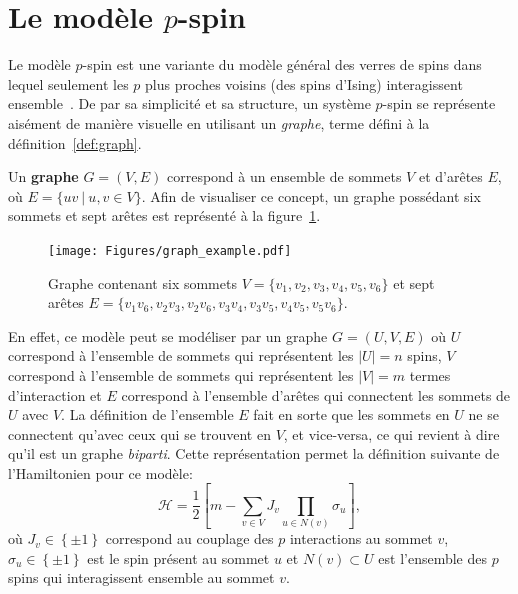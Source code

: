\section{Le modèle \texorpdfstring{$p$}{p}-spin} \label{sec:p-spin}
Le modèle $p$-spin est une variante du modèle général des verres de spins dans lequel seulement les $p$ plus proches voisins (des spins d'Ising) interagissent ensemble~\cite{}.
De par sa simplicité et sa structure, un système $p$-spin se représente aisément de manière visuelle en utilisant un \emph{graphe}, terme défini à la définition~\ref{def:graph}.
\begin{definition}\label{def:graph}
    Un \textbf{graphe} $G = (V, E)$ correspond à un ensemble de sommets $V$ et d'arêtes $E$, où $E = \{uv\ |\ u, v \in V\}$. Afin de visualiser ce concept, un graphe possédant six sommets  et sept arêtes est représenté à la figure~\ref{fig:random-graph}.
\end{definition}
\begin{figure}[h]
    \centering
    \texttt{[image: Figures/graph\_example.pdf]}
    \caption[Graphe contenant six sommets et sept arêtes.]{Graphe contenant six sommets $V = \{v_1, v_2, v_3, v_4, v_5, v_6\}$ et sept arêtes $E = \{v_1v_6, v_2v_3, v_2v_6, v_3v_4, v_3v_5, v_4v_5, v_5v_6\}$.}
    \label{fig:random-graph}
\end{figure}
En effet, ce modèle peut se modéliser par un graphe $G = (U, V, E)$ où $U$ correspond à l'ensemble de sommets qui représentent les $|U| = n$ spins, $V$ correspond à l'ensemble de sommets qui représentent les $|V| = m$ termes d'interaction et $E$ correspond à l'ensemble d'arêtes qui connectent les sommets de $U$ avec $V$.
La définition de l'ensemble $E$ fait en sorte que les sommets en $U$ ne se connectent qu'avec ceux qui se trouvent en $V$, et vice-versa, ce qui revient à dire qu'il est un graphe \emph{biparti}.
Cette représentation permet la définition suivante de l'Hamiltonien pour ce modèle:
\begin{equation} \label{eq:ham_p-spin}
    \mathcal{H} = \frac{1}{2} \left[m -\sum_{v \in V} J_{v}\prod_{u \in N(v)} \sigma_{u} \right],
\end{equation}
où $J_v \in \left\{\pm1\right\}$ correspond au couplage des $p$ interactions au sommet $v$, $\sigma_u \in \left\{\pm1\right\}$ est le spin présent au sommet $u$ et $N(v) \subset U$ est l'ensemble des $p$ spins qui interagissent ensemble au sommet $v$.
